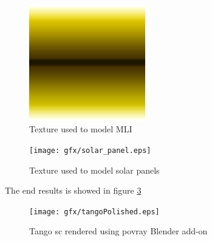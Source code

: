 \begin{figure}[htbp]
  \centering
  \includegraphics[width=0.45\textwidth]{gfx/foil_gold_ramp.eps}
  \caption{Texture used to model MLI}
  \label{fig:mliTexture}
\end{figure}

\begin{figure}[htbp]
  \centering
  \texttt{[image: gfx/solar\_panel.eps]}
  \caption{Texture used to model solar panels}
  \label{fig:solarPanelTexture}
\end{figure}

The end results is showed in figure \ref{fig:tangoblenderfinal}

\begin{figure}[htbp]
  \centering
  \texttt{[image: gfx/tangoPolished.eps]}
  \caption{Tango \acrshort{sc} rendered using \acrshort{povray} Blender add-on}
  \label{fig:tangoblenderfinal}
\end{figure}

